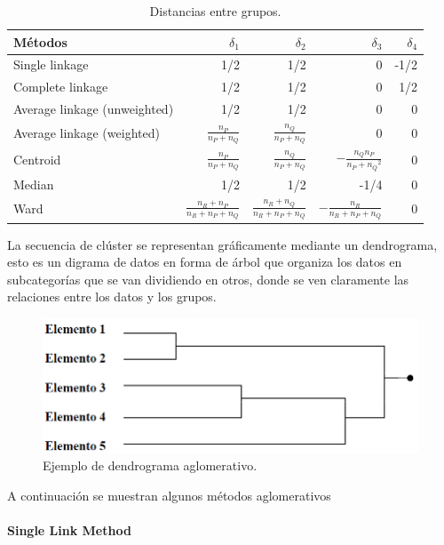 \documentclass[a4paper, 20pt]{article}
\begin{document}
\begin{table}[H]
  \caption{Distancias entre grupos.}
  \label{tab:groupDist}
\centering
  \begin{tabular}{lrrrr}
  \toprule
  Métodos & $\delta_1$ & $\delta_2$ & $\delta_3$ & $\delta_4$  \\
  \midrule
	Single linkage & 1/2 & 1/2 & 0 & -1/2\\
	Complete linkage & 1/2 & 1/2 & 0 & 1/2\\
	Average linkage (unweighted) & 1/2 & 1/2 & 0 & 0\\
	Average linkage (weighted) & $\frac{n_P}{n_P + n_Q}$ & $\frac{n_Q}{n_P + n_Q}$ & 0 & 0\\
	Centroid & $\frac{n_P}{n_P + n_Q}$ & $\frac{n_Q}{n_P + n_Q}$ & $-\frac{n_Q n_P}{{n_P + n_Q}^2}$ & 0\\
	Median & 1/2 & 1/2 & -1/4 & 0\\
	Ward & $\frac{n_R + n_P}{n_R + n_P + n_Q}$ & $\frac{n_R + n_Q}{n_R + n_P + n_Q}$ & $-\frac{n_R}{n_R + n_P + n_Q}$ & 0\\
  \bottomrule
\end{tabular}
\end{table}

La secuencia de clúster se representan gráficamente mediante un dendrograma, esto es un digrama de datos en forma de árbol que organiza los datos en subcategorías que se van dividiendo en otros, donde se ven claramente las relaciones entre los datos y los grupos.

\begin{figure}[H]
	\centering
	\includegraphics[scale=0.7]{victoria/aglomerativo}
	\caption{Ejemplo de dendrograma aglomerativo.}
	\label{fig:aglomerativo}
\end{figure}

A continuación se muestran algunos métodos aglomerativos

\paragraph{Single Link Method}
\end{document}
